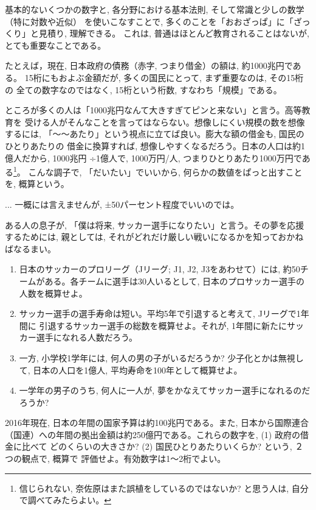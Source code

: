 基本的ないくつかの数字と, 各分野における基本法則, そして常識と少しの数学（特に対数や近似）
を使いこなすことで, 多くのことを「おおざっぱ」に「ざっくり」と見積り, 理解できる。
これは, 普通はほとんど教育されることはないが, とても重要なことである。\mv

たとえば，現在, 日本政府の債務（赤字, つまり借金）の額は, 約1000兆円である。
15桁にもおよぶ金額だが, 多くの国民にとって, まず重要なのは, その15桁の
全ての数字なのではなく, 15桁という桁数, すなわち「規模」である。

ところが多くの人は「1000兆円なんて大きすぎてピンと来ない」と言う。高等教育を
受ける人がそんなことを言ってはならない。想像しにくい規模の数を想像するには, 
「〜〜あたり」という視点に立てば良い。膨大な額の借金も, 国民のひとりあたりの
借金に換算すれば, 想像しやすくなるだろう。日本の人口は約1億人だから, 1000兆円
÷1億人で, 1000万円/人, つまりひとりあたり1000万円である\footnote{信じられない, 
奈佐原はまた誤植をしているのではないか? と思う人は, 自分で調べてみたらよい。}。
こんな調子で, 「だいたい」でいいから, 何らかの数値をぱっと出すことを, 
概算という。

\begin{faq}{\small{}
... 一概には言えませんが, ±50パーセント程度でいいのでは。}\end{faq}\mv

\begin{q}\label{q:soccer}
ある人の息子が, 「僕は将来, サッカー選手になりたい」と言う。その夢を応援
するためには, 親としては, それがどれだけ厳しい戦いになるかを知っておかねばなるまい。
\begin{enumerate}
\item 日本のサッカーのプロリーグ（Jリーグ; J1, J2, J3をあわせて）には, 
約50チームがある。各チームに選手は30人いるとして, 日本のプロサッカー選手の人数を概算せよ。
\item サッカー選手の選手寿命は短い。平均5年で引退すると考えて, Jリーグで1年間に
引退するサッカー選手の総数を概算せよ。それが, 1年間に新たにサッカー選手になれる人数だろう。
\item 一方, 小学校1学年には, 何人の男の子がいるだろうか? 少子化とかは無視して, 
日本の人口を1億人, 平均寿命を100年として概算せよ。
\item 一学年の男子のうち, 何人に一人が, 夢をかなえてサッカー選手になれるのだろうか? 
\end{enumerate}
\end{q}
\mv

\begin{q}\label{q:Japan_debt}
2016年現在, 日本の年間の国家予算は約100兆円である。また, 日本から国際連合
（国連）への年間の拠出金額は約250億円である。これらの数字を, (1) 政府の借金に比べて
どのくらいの大きさか?  (2) 国民ひとりあたりいくらか? という, ２つの観点で, 概算で
評価せよ。有効数字は1〜2桁でよい。
\end{q}
\vspace{0.2cm}

